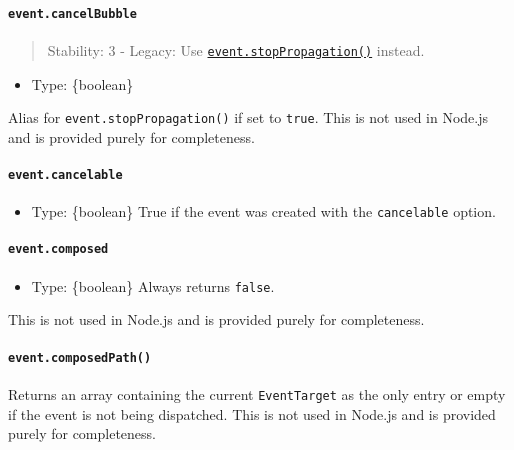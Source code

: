 \paragraph{\texorpdfstring{\texttt{event.cancelBubble}}{event.cancelBubble}}\label{event.cancelbubble}

\begin{quote}
Stability: 3 - Legacy: Use
\hyperref[eventstoppropagation]{\texttt{event.stopPropagation()}}
instead.
\end{quote}

\begin{itemize}
\tightlist
\item
  Type: \{boolean\}
\end{itemize}

Alias for \texttt{event.stopPropagation()} if set to \texttt{true}. This
is not used in Node.js and is provided purely for completeness.

\paragraph{\texorpdfstring{\texttt{event.cancelable}}{event.cancelable}}\label{event.cancelable}

\begin{itemize}
\tightlist
\item
  Type: \{boolean\} True if the event was created with the
  \texttt{cancelable} option.
\end{itemize}

\paragraph{\texorpdfstring{\texttt{event.composed}}{event.composed}}\label{event.composed}

\begin{itemize}
\tightlist
\item
  Type: \{boolean\} Always returns \texttt{false}.
\end{itemize}

This is not used in Node.js and is provided purely for completeness.

\paragraph{\texorpdfstring{\texttt{event.composedPath()}}{event.composedPath()}}\label{event.composedpath}

Returns an array containing the current \texttt{EventTarget} as the only
entry or empty if the event is not being dispatched. This is not used in
Node.js and is provided purely for completeness.

